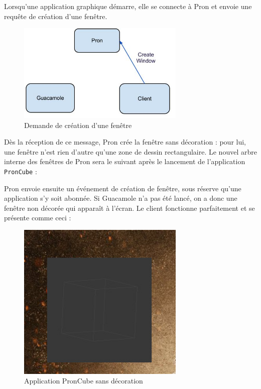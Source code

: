 Lorsqu'une application graphique démarre, elle se connecte à Pron et envoie une requête de création d'une fenêtre.

\begin{figure}[H]
  \centering
  \includegraphics[width=8cm]{images/Guacamole_anim_2.jpg}
  \caption{Demande de création d'une fenêtre}
  \label{fig:guacamole_anim_2}
\end{figure}

Dès la réception de ce message, Pron crée la fenêtre sans décoration : pour lui, une fenêtre n'est rien d'autre qu'une zone de dessin rectangulaire.
Le nouvel arbre interne des fenêtres de Pron sera le suivant après le lancement de l'application \verb|PronCube| :

\begin{center}
\end{center}

Pron envoie ensuite un événement de création de fenêtre, sous réserve qu'une application s'y soit abonnée.
Si Guacamole n'a pas été lancé, on a donc une fenêtre non décorée qui apparaît à l'écran.
Le client fonctionne parfaitement et se présente comme ceci :

\begin{figure}[H]
  \centering
  \includegraphics[width=8cm]{images/pron_cube_sans_decoration.jpg}
  \caption{Application PronCube sans décoration}
  \label{fig:pron_cube_sans_decoration}
\end{figure}

